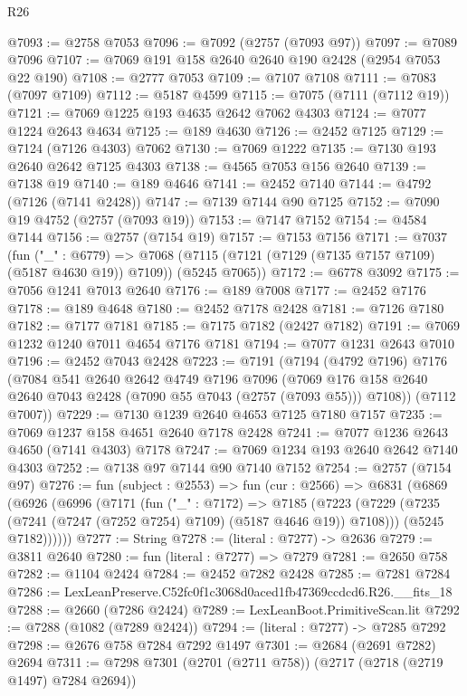 \begin{lexlean}{R26}
\begin{coremodule}
@7093 := @2758 @7053
@7096 := @7092 (@2757 (@7093 @97))
@7097 := @7089 @7096
@7107 := @7069 @191 @158 @2640 @2640 @190 @2428 (@2954 @7053 @22 @190)
@7108 := @2777 @7053
@7109 := @7107 @7108
@7111 := @7083 (@7097 @7109)
@7112 := @5187 @4599
@7115 := @7075 (@7111 (@7112 @19))
@7121 := @7069 @1225 @193 @4635 @2642 @7062 @4303
@7124 := @7077 @1224 @2643 @4634
@7125 := @189 @4630
@7126 := @2452 @7125
@7129 := @7124 (@7126 @4303) @7062
@7130 := @7069 @1222
@7135 := @7130 @193 @2640 @2642 @7125 @4303
@7138 := @4565 @7053 @156 @2640
@7139 := @7138 @19
@7140 := @189 @4646
@7141 := @2452 @7140
@7144 := @4792 (@7126 (@7141 @2428))
@7147 := @7139 @7144 @90 @7125
@7152 := @7090 @19 @4752 (@2757 (@7093 @19))
@7153 := @7147 @7152
@7154 := @4584 @7144
@7156 := @2757 (@7154 @19)
@7157 := @7153 @7156
@7171 := @7037
    (fun ("_" : @6779) =>
    @7068 (@7115 (@7121 (@7129 (@7135 @7157 @7109) (@5187 @4630 @19)) @7109)) (@5245 @7065))
@7172 := @6778 @3092
@7175 := @7056 @1241 @7013 @2640
@7176 := @189 @7008
@7177 := @2452 @7176
@7178 := @189 @4648
@7180 := @2452 @7178 @2428
@7181 := @7126 @7180
@7182 := @7177 @7181
@7185 := @7175 @7182 (@2427 @7182)
@7191 := @7069 @1232 @1240 @7011 @4654 @7176 @7181
@7194 := @7077 @1231 @2643 @7010
@7196 := @2452 @7043 @2428
@7223 := @7191
    (@7194
      (@4792 @7196)
      @7176
      (@7084
        @541
        @2640
        @2642
        @4749
        @7196
        @7096
        (@7069 @176 @158 @2640 @2640 @7043 @2428 (@7090 @55 @7043 (@2757 (@7093 @55))) @7108))
      (@7112 @7007))
@7229 := @7130 @1239 @2640 @4653 @7125 @7180 @7157
@7235 := @7069 @1237 @158 @4651 @2640 @7178 @2428
@7241 := @7077 @1236 @2643 @4650 (@7141 @4303) @7178
@7247 := @7069 @1234 @193 @2640 @2642 @7140 @4303
@7252 := @7138 @97 @7144 @90 @7140 @7152
@7254 := @2757 (@7154 @97)
@7276 := fun (subject : @2553) =>
  fun (cur : @2566) =>
  @6831
    (@6869
      (@6926
        (@6996
          (@7171
            (fun ("_" : @7172) =>
            @7185
              (@7223 (@7229 (@7235 (@7241 (@7247 (@7252 @7254) @7109) (@5187 @4646 @19)) @7108)))
              (@5245 @7182))))))
@7277 := String
@7278 := (literal : @7277) -> @2636
@7279 := @3811 @2640
@7280 := fun (literal : @7277) => @7279
@7281 := @2650 @758
@7282 := @1104 @2424
@7284 := @2452 @7282 @2428
@7285 := @7281 @7284
@7286 := LexLeanPreserve.C52fc0f1c3068d0aced1fb47369ccdcd6.R26.__fits_18
@7288 := @2660 (@7286 @2424)
@7289 := LexLeanBoot.PrimitiveScan.lit
@7292 := @7288 (@1082 (@7289 @2424))
@7294 := (literal : @7277) -> @7285 @7292
@7298 := @2676 @758 @7284 @7292 @1497
@7301 := @2684 (@2691 @7282) @2694
@7311 := @7298 @7301 (@2701 (@2711 @758)) (@2717 (@2718 (@2719 @1497) @7284 @2694))

\end{coremodule}
\end{lexlean}
